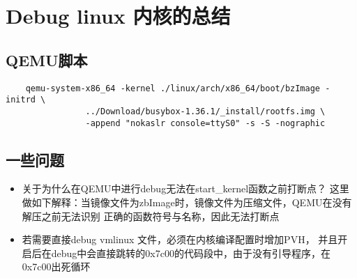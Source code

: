 \section{Debug linux 内核的总结}
  \subsection{QEMU脚本}
  \begin{lstlisting}
    qemu-system-x86_64 -kernel ./linux/arch/x86_64/boot/bzImage -initrd \
                ../Download/busybox-1.36.1/_install/rootfs.img \
                -append "nokaslr console=ttyS0" -s -S -nographic
  \end{lstlisting}
 
  \subsection{一些问题}
    \begin{itemize}
      \item 关于为什么在QEMU中进行debug无法在start\_kernel函数之前打断点？
      这里做如下解释：当镜像文件为zbImage时，镜像文件为压缩文件，QEMU在没有解压之前无法识别
      正确的函数符号与名称，因此无法打断点
      \item  若需要直接debug vmlinux 文件，必须在内核编译配置时增加PVH，
      并且开启后在debug中会直接跳转的0x7c00的代码段中，由于没有引导程序，在0x7c00出死循环
    \end{itemize}